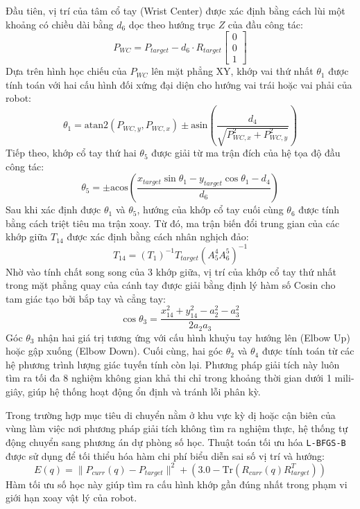 \documentclass[conference]{IEEEtran}
\begin{document}
Đầu tiên, vị trí của tâm cổ tay (Wrist Center) được xác định bằng cách lùi một khoảng có chiều dài bằng $d_6$ dọc theo hướng trục $Z$ của đầu công tác:
\begin{equation}
P_{WC} = P_{target} - d_6 \cdot R_{target} \begin{bmatrix} 0 \\ 0 \\ 1 \end{bmatrix}
\end{equation}
Dựa trên hình học chiếu của $P_{WC}$ lên mặt phẳng XY, khớp vai thứ nhất $\theta_1$ được tính toán với hai cấu hình đối xứng đại diện cho hướng vai trái hoặc vai phải của robot:
\begin{equation}
\theta_1 = \text{atan2}(P_{WC,y}, P_{WC,x}) \pm \text{asin}\left(\frac{d_4}{\sqrt{P_{WC,x}^2 + P_{WC,y}^2}}\right)
\end{equation}
Tiếp theo, khớp cổ tay thứ hai $\theta_5$ được giải từ ma trận đích của hệ tọa độ đầu công tác:
\begin{equation}
\theta_5 = \pm \text{acos}\left(\frac{x_{target}\sin\theta_1 - y_{target}\cos\theta_1 - d_4}{d_6}\right)
\end{equation}
Sau khi xác định được $\theta_1$ và $\theta_5$, hướng của khớp cổ tay cuối cùng $\theta_6$ được tính bằng cách triệt tiêu ma trận xoay. Từ đó, ma trận biến đổi trung gian của các khớp giữa $T_{14}$ được xác định bằng cách nhân nghịch đảo:
\begin{equation}
T_{14} = (T_1)^{-1} T_{target} (A_5^4 A_6^5)^{-1}
\end{equation}
Nhờ vào tính chất song song của 3 khớp giữa, vị trí của khớp cổ tay thứ nhất trong mặt phẳng quay của cánh tay được giải bằng định lý hàm số Cosin cho tam giác tạo bởi bắp tay và cẳng tay:
\begin{equation}
\cos\theta_3 = \frac{x_{14}^2 + y_{14}^2 - a_2^2 - a_3^2}{2 a_2 a_3}
\end{equation}
Góc $\theta_3$ nhận hai giá trị tương ứng với cấu hình khuỷu tay hướng lên (Elbow Up) hoặc gập xuống (Elbow Down). Cuối cùng, hai góc $\theta_2$ và $\theta_4$ được tính toán từ các hệ phương trình lượng giác tuyến tính còn lại. Phương pháp giải tích này luôn tìm ra tối đa 8 nghiệm không gian khả thi chỉ trong khoảng thời gian dưới 1 mili-giây, giúp hệ thống hoạt động ổn định và tránh lỗi phân kỳ.

Trong trường hợp mục tiêu di chuyển nằm ở khu vực kỳ dị hoặc cận biên của vùng làm việc nơi phương pháp giải tích không tìm ra nghiệm thực, hệ thống tự động chuyển sang phương án dự phòng số học. Thuật toán tối ưu hóa \texttt{L-BFGS-B} được sử dụng để tối thiểu hóa hàm chi phí biểu diễn sai số vị trí và hướng:
\begin{equation}
E(q) = \| P_{curr}(q) - P_{target} \|^2 + \left(3.0 - \text{Tr}(R_{curr}(q) R_{target}^T)\right)
\end{equation}
Hàm tối ưu số học này giúp tìm ra cấu hình khớp gần đúng nhất trong phạm vi giới hạn xoay vật lý của robot.
\end{document}
